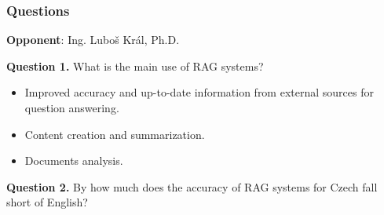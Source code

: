 \documentclass{beamer}
\newif\ifplacelogo
\begin{document}
\placelogotrue
\begin{frame}
  \frametitle{Questions}
  \textcolor{cvut_navy}{\textbf{Opponent}}: Ing. Luboš Král, Ph.D.

  \vspace{20px}

  \textcolor{cvut_navy}{\textbf{Question 1.}} What is the main use of RAG systems?
  \begin{itemize}
    \item Improved accuracy and up-to-date information from external sources for question answering.
    \item Content creation and summarization.
    \item Documents analysis.
  \end{itemize}
  \textcolor{cvut_navy}{\textbf{Question 2.}} By how much does the accuracy of RAG systems for Czech fall short of English?
\end{frame}
\end{document}
